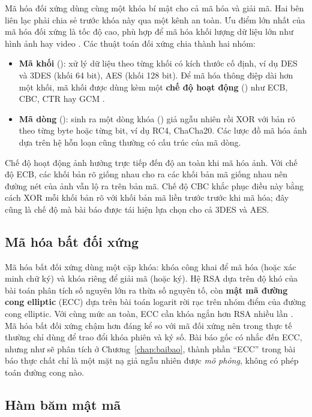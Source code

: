 Mã hóa đối xứng dùng cùng một khóa bí mật cho cả mã hóa và giải mã. Hai bên liên lạc phải
chia sẻ trước khóa này qua một kênh an toàn. Ưu điểm lớn nhất của mã hóa đối xứng là tốc độ
cao, phù hợp để mã hóa khối lượng dữ liệu lớn như hình ảnh hay video \cite{stallings2020}.
Các thuật toán đối xứng chia thành hai nhóm:
\begin{itemize}
  \item \textbf{Mã khối} (): xử lý dữ liệu theo từng khối có kích thước cố
        định, ví dụ DES và 3DES (khối 64 bit), AES (khối 128 bit). Để mã hóa thông điệp dài
        hơn một khối, mã khối được dùng kèm một \textbf{chế độ hoạt động} () như ECB, CBC, CTR hay GCM \cite{sp80038a}.
  \item \textbf{Mã dòng} (): sinh ra một dòng khóa () giả
        ngẫu nhiên rồi XOR với bản rõ theo từng byte hoặc từng bit, ví dụ RC4, ChaCha20. Các
        lược đồ mã hóa ảnh dựa trên hệ hỗn loạn cũng thường có cấu trúc của mã dòng.
\end{itemize}

Chế độ hoạt động ảnh hưởng trực tiếp đến độ an toàn khi mã hóa ảnh. Với chế độ ECB, các khối
bản rõ giống nhau cho ra các khối bản mã giống nhau nên đường nét của ảnh vẫn lộ ra trên bản
mã. Chế độ CBC khắc phục điều này bằng cách XOR mỗi khối bản rõ với khối bản mã liền trước
trước khi mã hóa; đây cũng là chế độ mà bài báo được tái hiện lựa chọn cho cả 3DES và AES.

\subsection{Mã hóa bất đối xứng}

Mã hóa bất đối xứng dùng một cặp khóa: khóa công khai để mã hóa (hoặc xác minh chữ ký) và
khóa riêng để giải mã (hoặc ký). Hệ RSA dựa trên độ khó của bài toán phân tích số nguyên lớn
ra thừa số nguyên tố, còn \textbf{mật mã đường cong elliptic} (ECC) dựa trên bài toán logarit
rời rạc trên nhóm điểm của đường cong elliptic. Với cùng mức an toàn, ECC cần khóa ngắn hơn
RSA nhiều lần \cite{katz2020}. Mã hóa bất đối xứng chậm hơn đáng kể so với mã đối xứng nên
trong thực tế thường chỉ dùng để trao đổi khóa phiên và ký số. Bài báo gốc có nhắc đến ECC,
nhưng như sẽ phân tích ở Chương~\ref{chap:baibao}, thành phần ``ECC'' trong bài báo thực chất
chỉ là một mặt nạ giả ngẫu nhiên được \emph{mô phỏng}, không có phép toán đường cong nào.

\subsection{Hàm băm mật mã}

